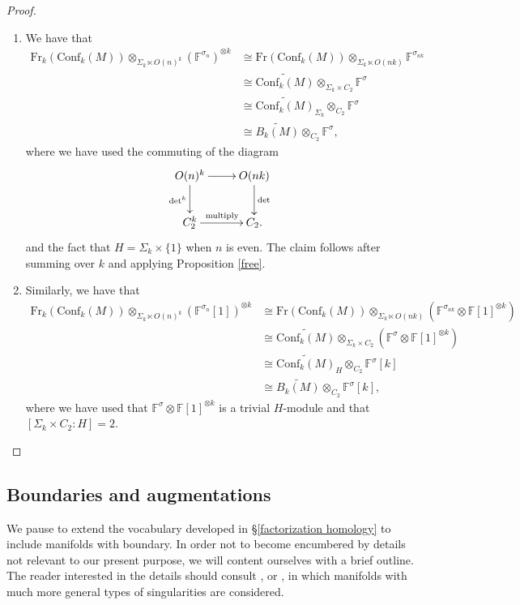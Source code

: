 \documentclass{compositio}
\theoremstyle{definition}\newtheorem{definition}{Definition}[section]
\theoremstyle{theorem}\newtheorem{lemma}[definition]{Lemma}
\theoremstyle{remark}\newtheorem*{conventions}{Conventions}
\theoremstyle{remark}\newtheorem*{acknowledgments}{Acknowledgments}
\theoremstyle{remark}\newtheorem*{outline}{Outline}
\theoremstyle{remark}\newtheorem*{questions}{Questions}
\theoremstyle{remark}\newtheorem{example}[definition]{Example}
\theoremstyle{definition}\newtheorem{construction}[definition]{Construction}
\theoremstyle{definition}\newtheorem*{convention}{Convention}
\theoremstyle{definition}\newtheorem*{conjecture}{Conjecture}
\theoremstyle{theorem}\newtheorem{theorem}[definition]{Theorem}
\theoremstyle{theorem}\newtheorem{paradigm}[definition]{Paradigm}
\theoremstyle{remark}\newtheorem{remark}[definition]{Remark}
\theoremstyle{corollary}\newtheorem{corollary}[definition]{Corollary}
\theoremstyle{theorem}\newtheorem{proposition}[definition]{Proposition}
\theoremstyle{definition}\newtheorem{question}[definition]{Question}
\begin{document}
\begin{proof} \begin{enumerate}
\item
We have that \begin{align*}
{\mathrm{Fr}}_{k}({\mathrm{Conf}}_k(M))\otimes_{\Sigma_k\ltimes O(n)^k}(\mathbb{F}^{\sigma_{n}})^{\otimes k}&\cong {\mathrm{Fr}}({\mathrm{Conf}}_k(M))\otimes_{\Sigma_k\ltimes O(nk)}\mathbb{F}^{\sigma_{nk}}
\\
&\cong\widetilde{{\mathrm{Conf}}_k(M)}\otimes_{\Sigma_k\times C_2}\mathbb{F}^\sigma\\
&\cong\widetilde{{\mathrm{Conf}}_k(M)}_{\Sigma_k}\otimes_{C_2}\mathbb{F}^\sigma\\ 
&\cong\widetilde{B_k(M)}\otimes_{C_2}\mathbb{F}^\sigma, 
\end{align*} where we have used the commuting of the diagram $$\xymatrix{
O(n)^k\ar[r]\ar[d]_{\det^k} &O(nk)\ar[d]^{\det}\\
C_2^k\ar[r]^{\text{multiply}} &C_2.
}$$ and the fact that $H=\Sigma_k\times \{1\}$ when $n$ is even. The claim follows after summing over $k$ and applying Proposition \ref{free}.

\item Similarly, we have that \begin{align*}
{\mathrm{Fr}}_{k}({\mathrm{Conf}}_k(M))\otimes_{\Sigma_k\ltimes O(n)^k}(\mathbb{F}^{\sigma_{n}}[1])^{\otimes k}&\cong {\mathrm{Fr}}({\mathrm{Conf}}_k(M))\otimes_{\Sigma_k\ltimes O(nk)}(\mathbb{F}^{\sigma_{nk}}\otimes\mathbb{F}[1]^{\otimes k})
\\
&\cong\widetilde{{\mathrm{Conf}}_k(M)}\otimes_{\Sigma_k\times C_2}(\mathbb{F}^\sigma\otimes\mathbb{F}[1]^{\otimes k})\\
&\cong\widetilde{{\mathrm{Conf}}_k(M)}_{H}\otimes_{C_2}\mathbb{F}^\sigma[k]\\ 
&\cong\widetilde{B_k(M)}\otimes_{C_2}\mathbb{F}^\sigma[k], 
\end{align*} where we have used that $\mathbb{F}^\sigma\otimes\mathbb{F}[1]^{\otimes k}$ is a trivial $H$-module and that $[\Sigma_k\times C_2:H]=2$.
\end{enumerate}
\end{proof}

\subsection{Boundaries and augmentations}\label{boundaries}

We pause to extend the vocabulary developed in \S\ref{factorization homology} to include manifolds with boundary. In order not to become encumbered by details not relevant to our present purpose, we will content ourselves with a brief outline. The reader interested in the details should consult \cite{AF}, or \cite{AFT}, in which manifolds with much more general types of singularities are considered.
\end{document}
